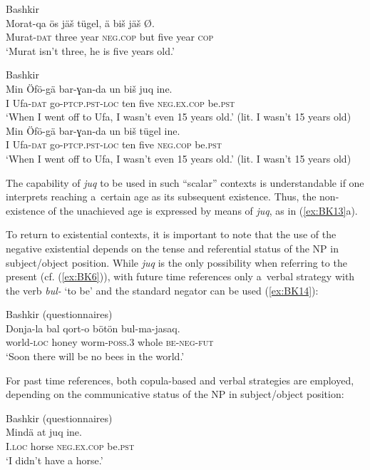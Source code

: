 \documentclass[output=paper,draft,draftmode,colorlinks,citecolor=brown]{langscibook}
\begin{document}
\ea Bashkir \citep[138]{mishchenko2017a} \label{ex:BK12}\\
	\gll Morat-qa	ös		jäš		tügel,			ä		biš		jäš		Ø.\\
	Murat-\textsc{dat}	three	year	\textsc{neg.cop}		but	five	year	\textsc{cop}\\
	\glt `Murat isn’t three, he is five years old.'
\z


\ea Bashkir \citep[139]{mishchenko2017a} \label{ex:BK13}\\
  \ea
	\gll Min	Öfö-gä	bar-ɣan-da		un		biš		juq			ine.\\
	I		Ufa-\textsc{dat}	go-\textsc{ptcp.pst-loc}	ten	five	\textsc{neg.ex.cop}	be.\textsc{pst}\\
	\glt `When I went off to Ufa, I wasn’t even 15 years old.' (lit. I wasn’t 15 years old)
  \ex
	\gll Min	Öfö-gä	bar-ɣan-da		un		biš		tügel			ine.\\
	I		Ufa-\textsc{dat}	go-\textsc{ptcp.pst-loc}	ten	five	\textsc{neg.cop}		be.\textsc{pst}\\
	\glt `When I went off to Ufa, I wasn’t even 15 years old.' (lit. I wasn’t 15 years old)
\z \z

The capability of \textit{juq} to be used in such “scalar” contexts is understandable if one interprets reaching a certain age as its subsequent existence. Thus, the non-existence of the unachieved age is expressed by means of \textit{juq}, as in (\ref{ex:BK13}a).

To return to existential contexts, it is important to note that the use of the negative existential depends on the tense and referential status of the NP in subject/object position. While \textit{juq} is the only possibility when referring to the present (cf. (\ref{ex:BK6})), with future time references only a verbal strategy with the verb \textit{bul-} ‘to be’ and the standard negator can be used (\ref{ex:BK14}):

\ea Bashkir (questionnaires) \label{ex:BK14}\\
	\gll Donja-la		bal		qort-o		bötön		bul-ma-jasaq.\\
	world-\textsc{loc}	honey	worm-\textsc{poss.3}	whole	\textsc{be-neg-fut}\\
	\glt `Soon there will be no bees in the world.'
\z

For past time references, both copula-based and verbal strategies are employed, depending on the communicative status of the NP in subject/object position:

\ea Bashkir (questionnaires) \label{ex:BK15}\\
	\gll Mindä		at		juq				ine.\\
	I.\textsc{loc}		horse	\textsc{neg.ex.cop}		be.\textsc{pst}\\
	\glt `I didn’t have a horse.'
\z
\end{document}
